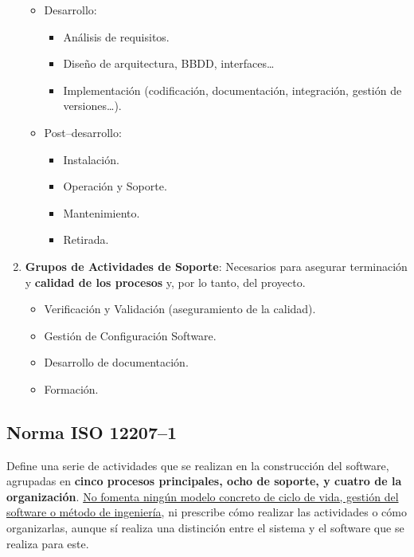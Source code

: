 \begin{enumerate}
\begin{itemize}
\begin{itemize}
                    \end{itemize}
              \item Desarrollo:
                    \begin{itemize}
                        \item Análisis de requisitos.
                        \item Diseño de arquitectura, BBDD, interfaces\ldots
                        \item Implementación (codificación, documentación, integración, gestión de versiones\ldots).
                    \end{itemize}
              \item Post--desarrollo:
                    \begin{itemize}
                        \item Instalación.
                        \item Operación y Soporte.
                        \item Mantenimiento.
                        \item Retirada.
                    \end{itemize}
          \end{itemize}
    \item \textbf{Grupos de Actividades de Soporte}: Necesarios para asegurar terminación y \textbf{calidad de los procesos} y, por lo tanto, del proyecto.
          \begin{itemize}
              \item Verificación y Validación (aseguramiento de la calidad).
              \item Gestión de Configuración Software.
              \item Desarrollo de documentación.
              \item Formación.
          \end{itemize}
\end{enumerate}

\subsection{Norma ISO 12207--1}
Define una serie de actividades que se realizan en la construcción del software, agrupadas en \textbf{cinco procesos principales, ocho de soporte, y cuatro de la organización}. \uline{No fomenta ningún modelo concreto de ciclo de vida, gestión del software o método de ingeniería}, ni prescribe cómo realizar las actividades o cómo organizarlas, aunque sí realiza una distinción entre el sistema y el software que se realiza para este.

